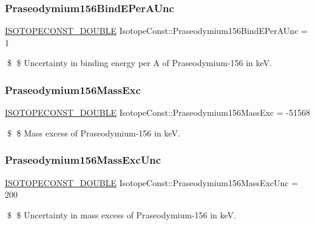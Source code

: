 \subsubsection{\texorpdfstring{Praseodymium156\+Bind\+E\+Per\+A\+Unc}{Praseodymium156BindEPerAUnc}}
{\footnotesize\ttfamily \mbox{\hyperlink{group___isotope_const-_macros_ga8f45a7272ce02c0b4c65c44636ed719a}{I\+S\+O\+T\+O\+P\+E\+C\+O\+N\+S\+T\+\_\+\+D\+O\+U\+B\+LE}} Isotope\+Const\+::\+Praseodymium156\+Bind\+E\+Per\+A\+Unc = 1}

\$ \$ Uncertainty in binding energy per A of Praseodymium-\/156 in keV. \mbox{\label{group___isotope_const-_praseodymium-_pr156_ga74c79036d5754ed6e78cc9bdc4b5287a}} 
\subsubsection{\texorpdfstring{Praseodymium156\+Mass\+Exc}{Praseodymium156MassExc}}
{\footnotesize\ttfamily \mbox{\hyperlink{group___isotope_const-_macros_ga8f45a7272ce02c0b4c65c44636ed719a}{I\+S\+O\+T\+O\+P\+E\+C\+O\+N\+S\+T\+\_\+\+D\+O\+U\+B\+LE}} Isotope\+Const\+::\+Praseodymium156\+Mass\+Exc = -\/51568}

\$ \$ Mass excess of Praseodymium-\/156 in keV. \mbox{\label{group___isotope_const-_praseodymium-_pr156_gaabd8f76328067e468ed6b67ecce94aab}} 
\subsubsection{\texorpdfstring{Praseodymium156\+Mass\+Exc\+Unc}{Praseodymium156MassExcUnc}}
{\footnotesize\ttfamily \mbox{\hyperlink{group___isotope_const-_macros_ga8f45a7272ce02c0b4c65c44636ed719a}{I\+S\+O\+T\+O\+P\+E\+C\+O\+N\+S\+T\+\_\+\+D\+O\+U\+B\+LE}} Isotope\+Const\+::\+Praseodymium156\+Mass\+Exc\+Unc = 200}

\$ \$ Uncertainty in mass excess of Praseodymium-\/156 in keV. \mbox{\label{group___isotope_const-_praseodymium-_pr156_ga6582f595eca99a91f26ebf752cec5bda}} 

